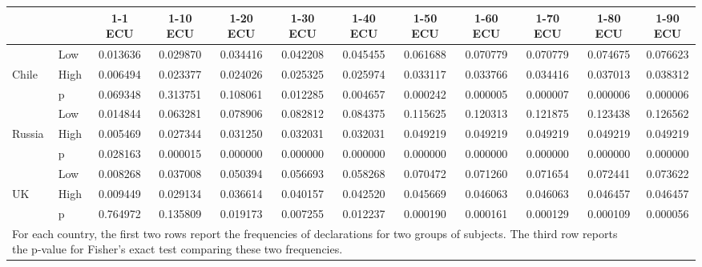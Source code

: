 \def\sym#1{\ifmmode^{#1}\else\(^{#1}\)\fi}
\begin{tabular}{|ll|cccccccccc|}
\hline\hline
&&1-1 ECU&1-10 ECU&1-20 ECU&1-30 ECU&1-40 ECU&1-50 ECU&1-60 ECU&1-70 ECU&1-80 ECU&1-90 ECU\\
\hline
&Low& 0.013636& 0.029870& 0.034416& 0.042208& 0.045455& 0.061688& 0.070779& 0.070779& 0.074675& 0.076623\\
Chile&High& 0.006494& 0.023377& 0.024026& 0.025325& 0.025974& 0.033117& 0.033766& 0.034416& 0.037013& 0.038312\\
&p& 0.069348& 0.313751& 0.108061& 0.012285& 0.004657& 0.000242& 0.000005& 0.000007& 0.000006& 0.000006\\
\hline&Low& 0.014844& 0.063281& 0.078906& 0.082812& 0.084375& 0.115625& 0.120313& 0.121875& 0.123438& 0.126562\\
Russia&High& 0.005469& 0.027344& 0.031250& 0.032031& 0.032031& 0.049219& 0.049219& 0.049219& 0.049219& 0.049219\\
&p& 0.028163& 0.000015& 0.000000& 0.000000& 0.000000& 0.000000& 0.000000& 0.000000& 0.000000& 0.000000\\
\hline&Low& 0.008268& 0.037008& 0.050394& 0.056693& 0.058268& 0.070472& 0.071260& 0.071654& 0.072441& 0.073622\\
UK&High& 0.009449& 0.029134& 0.036614& 0.040157& 0.042520& 0.045669& 0.046063& 0.046063& 0.046457& 0.046457\\
&p& 0.764972& 0.135809& 0.019173& 0.007255& 0.012237& 0.000190& 0.000161& 0.000129& 0.000109& 0.000056\\
\hline\multicolumn{11}{p{15cm}}{\tiny For each country, the first two rows report the frequencies of declarations for two groups of subjects. The third row reports the p-value for Fisher's exact test comparing these two frequencies.}\\
\end{tabular}